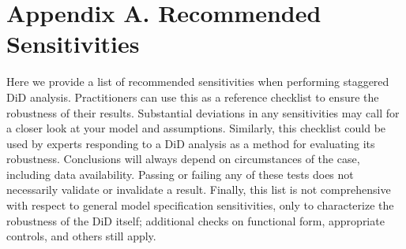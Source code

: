\documentclass[12pt]{article}
\begin{document}
\section*{Appendix A. Recommended Sensitivities} \label{sec:appendixa}
Here we provide a list of recommended sensitivities when performing staggered DiD analysis. Practitioners can use this as a reference checklist to ensure the robustness of their results. Substantial deviations in any sensitivities may call for a closer look at your model and assumptions. Similarly, this checklist could be used by experts responding to a DiD analysis as a method for evaluating its robustness. Conclusions will always depend on circumstances of the case, including data availability. Passing or failing any of these tests does not necessarily validate or invalidate a result. Finally, this list is not comprehensive with respect to general model specification sensitivities, only to characterize the robustness of the DiD itself; additional checks on functional form, appropriate controls, and others still apply.
\end{document}
